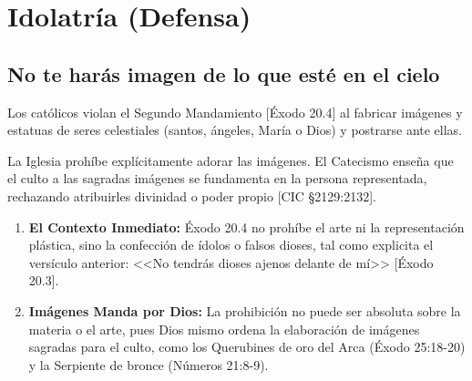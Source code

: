 \documentclass[12pt]{report}
\begin{document}
	
	\section{Idolatría (Defensa)}
	
	\subsection{No te harás imagen de lo que esté en el cielo}
	
	\begin{minibloque}[Objeción]
		Los católicos violan el Segundo Mandamiento [Éxodo 20.4] al fabricar imágenes y estatuas de seres celestiales (santos, ángeles, María o Dios) y postrarse ante ellas.
	\end{minibloque}
	
	\begin{minibloque}
		La Iglesia prohíbe explícitamente adorar las imágenes. El Catecismo enseña que el culto a las sagradas imágenes se fundamenta en la persona representada, rechazando atribuirles divinidad o poder propio [CIC \S 2129:2132].
	\end{minibloque}
	
	\begin{bloque}[Respuesta]\leavevmode
		\begin{enumerate}
			\item \textbf{El Contexto Inmediato:} Éxodo 20.4 no prohíbe el arte ni la representación plástica, sino la confección de ídolos o falsos dioses, tal como explicita el versículo anterior: <<No tendrás dioses ajenos delante de mí>> [Éxodo 20.3].
			
			\item \textbf{Imágenes Manda por Dios:} La prohibición no puede ser absoluta sobre la materia o el arte, pues Dios mismo ordena la elaboración de imágenes sagradas para el culto, como los Querubines de oro del Arca (Éxodo 25:18-20) y la Serpiente de bronce (Números 21:8-9).
		\end{enumerate}
	\end{bloque}
	
\end{document}
